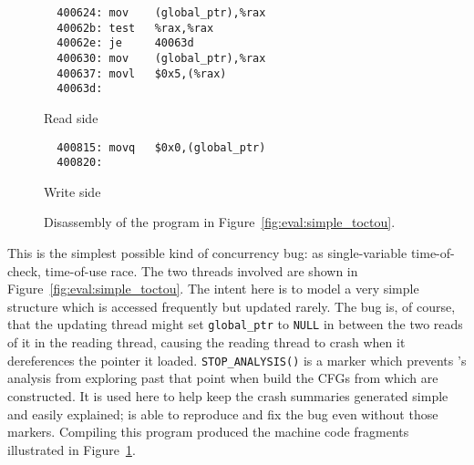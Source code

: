 \begin{figure}
  \begin{subfloat}
    \begin{minipage}{70mm}
\begin{verbatim}
  400624: mov    (global_ptr),%rax
  40062b: test   %rax,%rax
  40062e: je     40063d
  400630: mov    (global_ptr),%rax
  400637: movl   $0x5,(%rax)
  40063d:
\end{verbatim}
    \end{minipage}
    \caption{Read side}
  \end{subfloat}
  \begin{subfloat}
    \begin{minipage}{70mm}
\begin{verbatim}
  400815: movq   $0x0,(global_ptr)
  400820:
\end{verbatim}
    \end{minipage}
    \caption{Write side}
  \end{subfloat}
  \caption{Disassembly of the program in Figure~\ref{fig:eval:simple_toctou}.}
  \label{fig:eval:simple_toctou_compiled}
\end{figure}

This is the simplest possible kind of concurrency bug: as
single-variable time-of-check, time-of-use race.  The two threads
involved are shown in Figure~\ref{fig:eval:simple_toctou}.  The intent
here is to model a very simple structure which is accessed frequently
but updated rarely.  The bug is, of course, that the updating thread
might set \verb|global_ptr| to \verb|NULL| in between the two reads of
it in the reading thread, causing the reading thread to crash when it
dereferences the pointer it loaded.  \verb|STOP_ANALYSIS()| is a
marker which prevents {\technique}'s analysis from exploring past that
point when build the CFGs from which {\StateMachines} are constructed.
It is used here to help keep the crash summaries generated simple and
easily explained; {\implementation} is able to reproduce and fix the
bug even without those markers.
Compiling this program produced the machine code fragments illustrated
in Figure~\ref{fig:eval:simple_toctou_compiled}.


